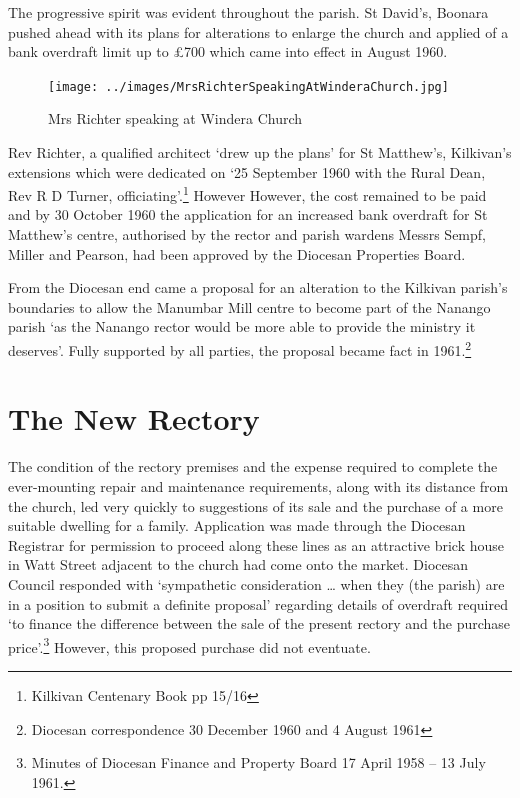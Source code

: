 The progressive spirit was evident throughout the parish. St David's, Boonara pushed ahead with its plans for alterations to enlarge the church and applied of a bank overdraft limit up to \pounds700 which came into effect in August 1960.









\begin{figure}[!htb]
\begin{center}
\texttt{[image: ../images/MrsRichterSpeakingAtWinderaChurch.jpg]}
\caption{Mrs Richter speaking at Windera Church}
\end{center}
\end{figure}




Rev Richter, a qualified architect `drew up the plans' for St Matthew's, Kilkivan's extensions which were dedicated on `25 September 1960 with the Rural Dean, Rev R D Turner, officiating'.\footnote{Kilkivan Centenary Book pp 15/16} However However, the cost remained to be paid and by 30 October 1960 the application for an increased bank overdraft for St Matthew's centre, authorised by the rector and parish wardens Messrs Sempf, Miller and Pearson, had been approved by the Diocesan Properties Board.


From the Diocesan end came a proposal for an alteration to the Kilkivan parish's boundaries to allow the Manumbar Mill centre to become part of the Nanango parish `as the Nanango rector would be more able to provide the ministry it deserves'. Fully supported by all parties, the proposal became fact in 1961.\footnote{Diocesan correspondence 30 December 1960 and 4 August 1961}


\section{The New Rectory}



The condition of the rectory premises and the expense required to complete the ever-mounting repair and maintenance requirements, along with its distance from the church, led very quickly to suggestions of its sale and the purchase of a more suitable dwelling for a family. Application was made through the Diocesan Registrar for permission to proceed along these lines as an attractive brick house in Watt Street adjacent to the church had come onto the market. Diocesan Council responded with `sympathetic consideration \ldots{} when they (the parish) are in a position to submit a definite proposal' regarding details of overdraft required `to finance the difference between the sale of the present rectory and the purchase price'.\footnote{Minutes of Diocesan Finance and Property Board 17 April 1958 -- 13 July 1961.} However, this proposed purchase did not eventuate.








